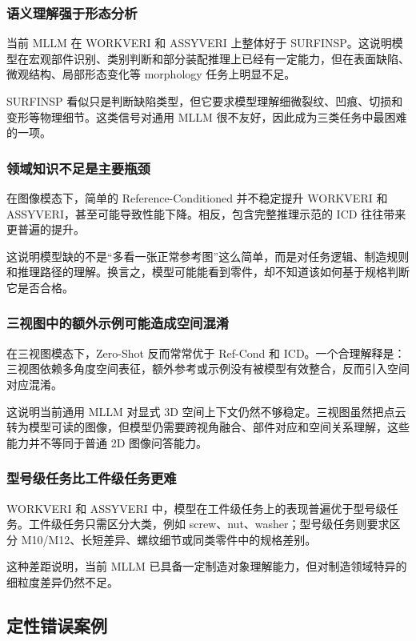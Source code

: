 \subsubsection{语义理解强于形态分析}

当前 MLLM 在 WORKVERI 和 ASSYVERI 上整体好于 SURFINSP。这说明模型在宏观部件识别、类别判断和部分装配推理上已经有一定能力，但在表面缺陷、微观结构、局部形态变化等 morphology 任务上明显不足。

SURFINSP 看似只是判断缺陷类型，但它要求模型理解细微裂纹、凹痕、切损和变形等物理细节。这类信号对通用 MLLM 很不友好，因此成为三类任务中最困难的一项。

\subsubsection{领域知识不足是主要瓶颈}

在图像模态下，简单的 Reference-Conditioned 并不稳定提升 WORKVERI 和 ASSYVERI，甚至可能导致性能下降。相反，包含完整推理示范的 ICD 往往带来更普遍的提升。

这说明模型缺的不是“多看一张正常参考图”这么简单，而是对任务逻辑、制造规则和推理路径的理解。换言之，模型可能能看到零件，却不知道该如何基于规格判断它是否合格。

\subsubsection{三视图中的额外示例可能造成空间混淆}

在三视图模态下，Zero-Shot 反而常常优于 Ref-Cond 和 ICD。一个合理解释是：三视图依赖多角度空间表征，额外参考或示例没有被模型有效整合，反而引入空间对应混淆。

这说明当前通用 MLLM 对显式 3D 空间上下文仍然不够稳定。三视图虽然把点云转为模型可读的图像，但模型仍需要跨视角融合、部件对应和空间关系理解，这些能力并不等同于普通 2D 图像问答能力。

\subsubsection{型号级任务比工件级任务更难}

WORKVERI 和 ASSYVERI 中，模型在工件级任务上的表现普遍优于型号级任务。工件级任务只需区分大类，例如 screw、nut、washer；型号级任务则要求区分 M10/M12、长短差异、螺纹细节或同类零件中的规格差别。

这种差距说明，当前 MLLM 已具备一定制造对象理解能力，但对制造领域特异的细粒度差异仍然不足。

\subsection{定性错误案例}

